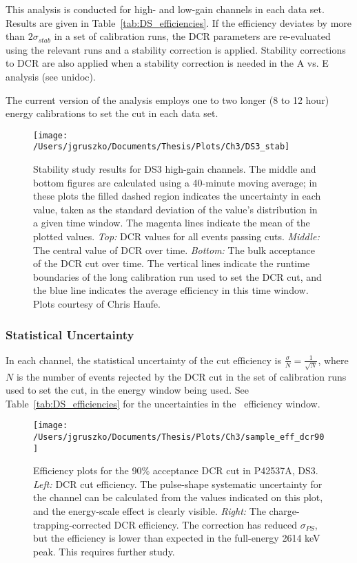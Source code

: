 This analysis is conducted for high- and low-gain channels in each data set. Results are given in Table~\ref{tab:DS_efficiencies}. If the efficiency deviates by more than $2\sigma_{stab}$ in a set of calibration runs, the DCR parameters are re-evaluated using the relevant runs and a stability correction is applied. Stability corrections to DCR are also applied when a stability correction is needed in the A vs. E analysis (see unidoc).

The current version of the analysis employs one to two longer (8 to 12 hour) energy calibrations to set the cut in each data set. 

\begin{sidewaysfigure}[]
 \centering
 \texttt{[image: /Users/jgruszko/Documents/Thesis/Plots/Ch3/DS3\_stab]}
 \caption[DCR stability study results in DS3 high-gain channels]{Stability study results for DS3 high-gain channels. The middle and bottom figures are calculated using a 40-minute moving average; in these plots the filled dashed region indicates the uncertainty in each value, taken as the standard deviation of the value's distribution in a given time window. The magenta lines indicate the mean of the plotted values. {\it Top:} DCR values for all events passing cuts. {\it Middle:} The central value of DCR over time. {\it Bottom:} The bulk acceptance of the DCR cut over time. The vertical lines indicate the runtime boundaries of the long calibration run used to set the DCR cut, and the blue line indicates the average efficiency in this time window. Plots courtesy of Chris Haufe.} 
 \label{fig:DS3_stab}
\end{sidewaysfigure}


\subsubsection{Statistical Uncertainty}
In each channel, the statistical uncertainty of the cut efficiency is $\frac{\sigma}{N} = \frac{1}{\sqrt{N}}$, where $N$ is the number of events rejected by the DCR cut in the set of calibration runs used to set the cut, in the energy window being used. See Table~\ref{tab:DS_efficiencies} for the uncertainties in the \nonubb\ efficiency window.

\begin{figure*}[t]
 \centering
 \texttt{[image: /Users/jgruszko/Documents/Thesis/Plots/Ch3/sample\_eff\_dcr90]}
 \caption[DCR cut efficiency and uncertainties]{Efficiency plots for the 90\% acceptance DCR cut in P42537A, DS3. {\it Left:} DCR cut efficiency. The pulse-shape systematic uncertainty for the channel can be calculated from the values indicated on this plot, and the energy-scale effect is clearly visible. {\it Right:} The charge-trapping-corrected DCR efficiency. The correction has reduced $\sigma_{PS}$, but the efficiency is lower than expected in the full-energy 2614 keV peak. This requires further study.} 
 \label{fig:singleCh_eff}
\end{figure*}

